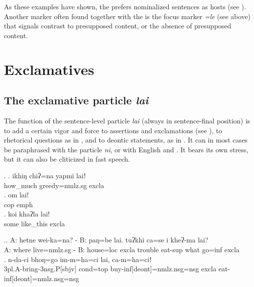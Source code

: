  As these  examples have shown, the  prefers nominalized sentences as hosts (see ). Another marker often found together with the  is the focus marker \emph{=le} (see above) that signals contrast to presupposed content, or the absence of presupposed content.

 
\section{Exclamatives}\label{ptcl-excla}

\subsection{The exclamative particle \emph{lai}}
 
The  function of the sentence-level particle \emph{lai} (always in sentence-final position) is to add a certain vigor and force to assertions and exclamations (see \Next), to rhetorical questions as in \NNext[a], and to deontic statements, as in \NNext[b]. It can in most cases be paraphrased with the  particle \emph{ni}, or with English  and . It bears its own stress, but it can also be cliticized in fast speech. 
  
 \ex. \ag. ikhiŋ chiʔ=na yapmi laiǃ \\
 		how\_much greedy{\sc =nmlz.sg}  {\sc excla}\\
 	\bg. om lai!\\
 	{\sc cop} {\sc emph}\\
\newpage
	  \bg. koi  khaʔla lai!\\
   		some like\_this {\sc excla}\\
	
 	\ex.\ag. A: hetne wei-ka=na?   - B: paŋ=be lai. tuʔkhi ca=se   i    kheʔ-ma lai?\\
 		A: where live{=nmlz.sg} - B: house{\sc =loc} {\sc excla} trouble eat{\sc -sup}  what go{\sc =inf} {\sc excla}\\
 	\bg. n-da-ci bhoŋ=go     im-m=ha=ci lai,  ca-m=ha=ciǃ\\
 			{\sc 3pl.A-}bring{\sc -3nsg.P[sbjv]} {\sc cond=top} buy{\sc -inf[deont]=nmlz.nsg=nsg} {\sc excla} eat{\sc -inf[deont]=nmlz.nsg=nsg}\\
 	 
	

